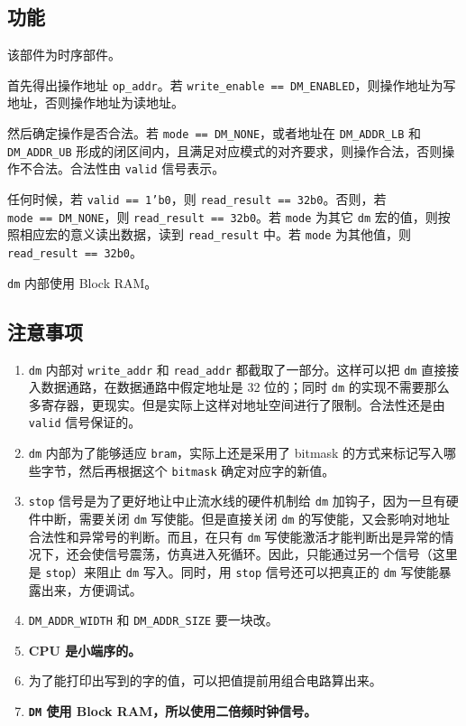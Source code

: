 \documentclass[12pt,AutoFakeBold,AutoFakeSlant]{article}
\providecommand{\tightlist}{%
  \setlength{\itemsep}{0pt}\setlength{\parskip}{0pt}}
\newcommand{\ms}[1]{\texttt{#1}}
\begin{document}
\hypertarget{ux529fux80fd-9}{%
\subsection{功能}\label{ux529fux80fd-9}}

该部件为时序部件。

首先得出操作地址 \texttt{op\_addr}。若
\texttt{write\_enable\ ==\ DM\_ENABLED}，则操作地址为写地址，否则操作地址为读地址。

然后确定操作是否合法。若 \ms{mode == DM\_NONE}，或者地址在 \ms{DM\_ADDR\_LB} 和 \ms{DM\_ADDR\_UB} 形成的闭区间内，且满足对应模式的对齐要求，则操作合法，否则操作不合法。合法性由 \ms{valid} 信号表示。

任何时候，若 \texttt{valid\ ==\ 1'b0}，则
\texttt{read\_result\ ==\ 32\textquotesingle{}b0}。否则，若
\texttt{mode\ ==\ DM\_NONE}，则
\texttt{read\_result\ ==\ 32\textquotesingle{}b0}。若 \texttt{mode}
为其它 \texttt{dm} 宏的值，则按照相应宏的意义读出数据，读到
\texttt{read\_result} 中。若 \texttt{mode} 为其他值，则
\texttt{read\_result\ ==\ 32\textquotesingle{}b0}。

\ms{dm} 内部使用 Block RAM。

\hypertarget{ux6ce8ux610fux4e8bux9879-6}{%
\subsection{注意事项}\label{ux6ce8ux610fux4e8bux9879-6}}

\begin{enumerate}
\def\labelenumi{\arabic{enumi}.}
\tightlist
\item
  \texttt{dm} 内部对 \texttt{write\_addr} 和 \texttt{read\_addr} 都截取了一部分。这样可以把 \texttt{dm} 直接接入数据通路，在数据通路中假定地址是 32 位的；同时 \texttt{dm} 的实现不需要那么多寄存器，更现实。但是实际上这样对地址空间进行了限制。合法性还是由 \ms{valid} 信号保证的。
\item
  \ms{dm} 内部为了能够适应 \ms{bram}，实际上还是采用了 bitmask 的方式来标记写入哪些字节，然后再根据这个 \ms{bitmask} 确定对应字的新值。
\item
  \ms{stop} 信号是为了更好地让中止流水线的硬件机制给 \ms{dm} 加钩子，因为一旦有硬件中断，需要关闭 \ms{dm} 写使能。但是直接关闭 \ms{dm} 的写使能，又会影响对地址合法性和异常号的判断。而且，在只有 \ms{dm} 写使能激活才能判断出是异常的情况下，还会使信号震荡，仿真进入死循环。因此，只能通过另一个信号（这里是 \ms{stop}）来阻止 \ms{dm} 写入。同时，用 \ms{stop} 信号还可以把真正的 \ms{dm} 写使能暴露出来，方便调试。
\item
  \texttt{DM\_ADDR\_WIDTH} 和 \texttt{DM\_ADDR\_SIZE} 要一块改。
\item
  \textbf{CPU 是小端序的。}
\item
  为了能打印出写到的字的值，可以把值提前用组合电路算出来。
\item
  \textbf{\ms{DM} 使用 Block RAM，所以使用二倍频时钟信号。}
\end{enumerate}
\end{document}
